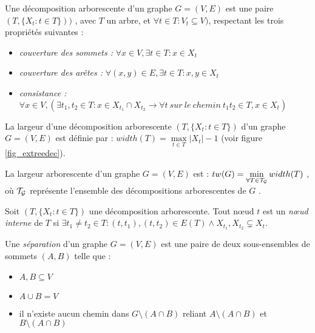 
\label{treedec}
	Une décomposition arborescente d'un graphe $G = (V,E)$ est une paire
	$(T,\{X_t : t\in T\}))$
	, avec $T$ un arbre, et $\forall t \in T : V_t \subseteq V)$, respectant
	les trois propriétés suivantes :
	\begin{itemize}
		\item {\em couverture des sommets :}
		$\forall x \in V, \exists t \in T : x \in X_t$            
		\item {\em couverture des arêtes :}
		$\forall (x,y) \in E, \exists t \in T : x,y \in X_t$      
		\item {\em consistance :}
		$\forall x \in V, (\exists t_1,t_2 \in T : x\in X_{t_1} \cap X_{t_2} \rightarrow
	     \forall t\ sur\ le\ chemin\ t_1t_2 \in T, x\in X_t)$
	\end{itemize}

\label{width}
	La largeur d'une décomposition arborescente $(T,\{X_t : t \in T\})$ d'un graphe
	$G = (V,E)$ est définie par : $width(T) = \max\limits_{t \in T}|X_t| - 1$
(voir figure \ref{fig_extreedec}).



\label{treewidth}
	La largeur arborescente d'un graphe $G = (V,E)$ est :
	$tw(G) = \min\limits_{\forall T \in \cal{T}_G} width(T)$
	, où $\cal{T}_G$ représente l'ensemble des décompositions
	arborescentes de $G$ .


\label{intnode}
	Soit $(T,\{X_t : t\in T\})$ une décomposition arborescente.
	Tout n\oe ud $t$ est un {\em n\oe ud interne} de $T$ si 
	$\exists t_1 \neq t_2 \in T : (t,t_1),(t,t_2) \in E(T) \wedge X_{t_1},X_{t_2} \subsetneq X_t$.

\label{defsep}
	Une {\em séparation} d'un graphe $G = (V,E)$ est une paire de deux sous-ensembles de sommets
	$(A,B)$ telle que :
	\begin{itemize}
		\item $A,B \subseteq V$
		\item $A \cup B = V$
		\item il n'existe aucun chemin dans $G \setminus (A\cap B)$ reliant $A \setminus (A \cap B)$
		et $B \setminus (A \cap B)$
	\end{itemize}

